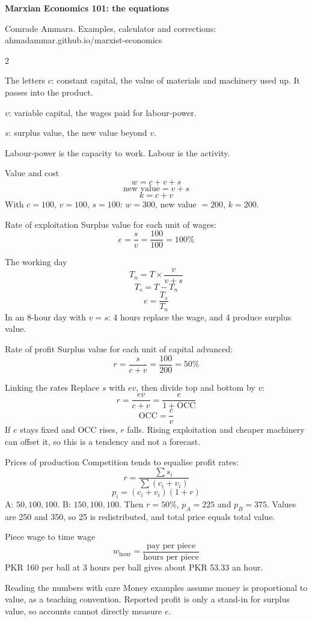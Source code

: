 \documentclass[10pt]{extarticle}
\begin{document}
{\LARGE\bfseries Marxian Economics 101: the equations}\par\vspace{2pt}
Comrade Ammara. Examples, calculator and corrections: ahmadammar.github.io/marxist-economics\par\vspace{3pt}
\begin{multicols}{2}
\begin{qbox}{The letters}
$c$: constant capital, the value of materials and machinery used up. It passes into the product.\par
$v$: variable capital, the wages paid for labour-power.\par
$s$: surplus value, the new value beyond $v$.\par
Labour-power is the capacity to work. Labour is the activity.
\end{qbox}
\begin{qbox}{Value and cost}
\[w = c + v + s\]
\[\text{new value} = v + s\]
\[k = c + v\]
With $c=100$, $v=100$, $s=100$: $w=300$, new value $=200$, $k=200$.
\end{qbox}
\begin{qbox}{Rate of exploitation}
Surplus value for each unit of wages:
\[e = \frac{s}{v} = \frac{100}{100} = 100\%\]
\end{qbox}
\begin{qbox}{The working day}
\[T_n = T \times \frac{v}{v+s}\]
\[T_s = T - T_n\]
\[e = \frac{T_s}{T_n}\]
In an 8-hour day with $v=s$: 4 hours replace the wage, and 4 produce surplus value.
\end{qbox}
\begin{qbox}{Rate of profit}
Surplus value for each unit of capital advanced:
\[r = \frac{s}{c+v} = \frac{100}{200} = 50\%\]
\end{qbox}
\columnbreak
\begin{qbox}{Linking the rates}
Replace $s$ with $ev$, then divide top and bottom by $v$:
\[r = \frac{ev}{c+v} = \frac{e}{1+\mathrm{OCC}}\]
\[\mathrm{OCC} = \frac{c}{v}\]
If $e$ stays fixed and OCC rises, $r$ falls. Rising exploitation and cheaper machinery can offset it, so this is a tendency and not a forecast.
\end{qbox}
\begin{qbox}{Prices of production}
Competition tends to equalise profit rates:
\[r = \frac{\sum s_i}{\sum (c_i+v_i)}\]
\[p_i = (c_i+v_i)(1+r)\]
A: $50,100,100$. B: $150,100,100$. Then $r=50\%$, $p_A=225$ and $p_B=375$. Values are 250 and 350, so 25 is redistributed, and total price equals total value.
\end{qbox}
\begin{qbox}{Piece wage to time wage}
\[w_{\text{hour}} = \frac{\text{pay per piece}}{\text{hours per piece}}\]
PKR 160 per ball at 3 hours per ball gives about PKR 53.33 an hour.
\end{qbox}
\begin{qbox}{Reading the numbers with care}
Money examples assume money is proportional to value, as a teaching convention. Reported profit is only a stand-in for surplus value, so accounts cannot directly measure $e$.
\end{qbox}
\end{multicols}
\end{document}
